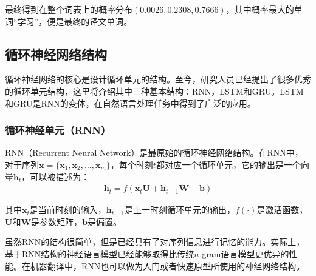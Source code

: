\parinterval 最终得到在整个词表上的概率分布$(0.0026,0.2308,0.7666)$，其中概率最大的单词``学习''，便是最终的译文单词。


\subsection{循环神经网络结构}
\label{sec:6.3.3}

\parinterval 循环神经网络的核心是设计循环单元的结构。至今，研究人员已经提出了很多优秀的循环单元结构，这里将介绍其中三种基本结构：RNN，LSTM和GRU。LSTM\\和GRU是RNN的变体，在自然语言处理任务中得到了广泛的应用。


\subsubsection{循环神经单元（RNN）}

\parinterval RNN（Recurrent Neural Network）是最原始的循环神经网络结构。在RNN中，对于序列$\mathbf{x}=\{ \mathbf{x}_1, \mathbf{x}_2,...,\mathbf{x}_m \}$，每个时刻$t$都对应一个循环单元，它的输出是一个向量$\mathbf{h}_t$，可以被描述为：
\begin{eqnarray}
\mathbf{h}_t=f(\mathbf{x}_t \mathbf{U}+\mathbf{h}_{t-1} \mathbf{W}+\mathbf{b})
\label{eq:6-11}
\end{eqnarray}

\noindent 其中$\mathbf{x}_t$是当前时刻的输入，$\mathbf{h}_{t-1}$是上一时刻循环单元的输出，$f(\cdot)$是激活函数，$\mathbf{U}$和$\mathbf{W}$是参数矩阵，$\mathbf{b}$是偏置。

\parinterval 虽然RNN的结构很简单，但是已经具有了对序列信息进行记忆的能力。实际上，基于RNN结构的神经语言模型已经能够取得比传统$n$-gram语言模型更优异的性能。在机器翻译中，RNN也可以做为入门或者快速原型所使用的神经网络结构。


